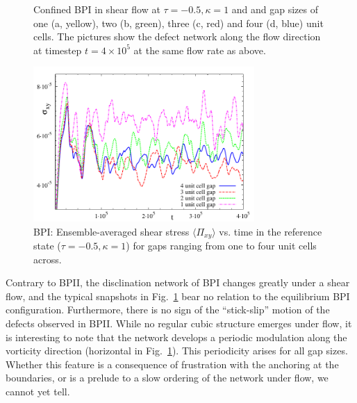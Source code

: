 \documentclass[12pt,twoside]{iopart}
\newcommand{\ex}[1]{\times10^{#1}}
\begin{document}
\begin{figure}[h]
\caption{Confined BPI in shear flow at $\tau=-0.5, \kappa=1$ and and gap sizes of one (a, yellow), two (b, green), three (c, red) and four (d, blue) unit cells. The pictures show the defect network along the flow direction at timestep $t=4\ex{5}$ at the same flow rate as above.}
\label{fig4}
\end{figure}


\begin{figure}[h]
\centering
\includegraphics[width=0.75\textwidth]{stress_bp1_fbc.pdf}
\caption{BPI: Ensemble-averaged shear stress $\langle \Pi_{xy}\rangle$ vs. time in the reference state ($\tau=-0.5, \kappa=1$) for gaps ranging from one to four unit cells across.}
\label{fig5}
\end{figure}

Contrary to BPII, the disclination network of BPI changes greatly under a shear flow, and the typical snapshots in Fig.~\ref{fig4} bear no relation to the equilibrium BPI configuration. Furthermore, there is no sign of the ``stick-slip'' motion of the defects observed in BPII. While no regular cubic structure emerges under flow, it is interesting to note that the network develops a periodic modulation along the vorticity direction (horizontal in Fig.~\ref{fig4}). This periodicity arises for all gap sizes. Whether this feature is a consequence of frustration with the anchoring at the boundaries, or is a prelude to a slow ordering of the network under flow, we cannot yet tell.
\end{document}
